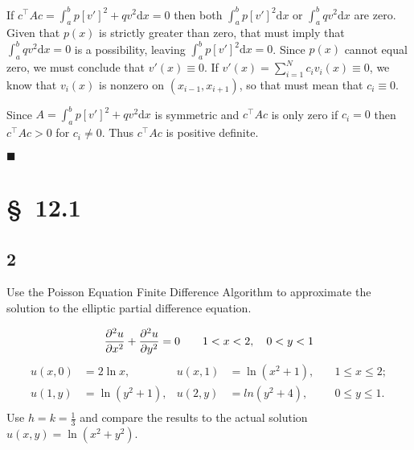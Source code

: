 \documentclass[12pt]{article}
\newcommand{\dd}[1]{\mathrm{d}{#1}}
\begin{document}
\hfill

If $c^\intercal Ac = \int_a^bp[v']^2+qv^2\dd{x} = 0$ then both
$\int_a^bp[v']^2\dd{x}$ or $\int_a^bqv^2\dd{x}$ are zero. Given that
$p(x)$ is strictly greater than zero, that must imply that
$\int_a^bqv^2\dd{x}=0$ is a possibility, leaving
$\int_a^bp[v']^2\dd{x}=0$. Since $p(x)$ cannot equal zero, we must
conclude that $v'(x)\equiv0$. If
$v'(x)=\sum_{i=1}^Nc_iv_i(x)\equiv0$, we know that $v_i(x)$ is
nonzero on $(x_{i-1},x_{i+1})$, so that must mean that $c_i\equiv0$.

Since $A=\int_a^bp[v']^2+qv^2\dd{x}$ is symmetric and $c^\intercal Ac$
is only zero if $c_i=0$ then $c^\intercal Ac>0$ for $c_i\neq0$. Thus
$c^\intercal Ac$ is positive definite.

\hfill $\blacksquare$

\section{\S~12.1}
\subsection{2}
Use the Poisson Equation Finite Difference Algorithm to approximate
the solution to the elliptic partial difference equation.

\begin{equation*}
  \frac{\partial^2 u}{\partial x^2}+\frac{\partial^2 u}{\partial
    y^2}=0 \qquad 1<x<2,\quad 0<y<1 \\
\end{equation*}
\begin{equation*}
  \begin{aligned}
    u(x,0)&=2\ln x, &u(x,1)&=\ln(x^2+1),\quad &1\leq x\leq 2; \\
    u(1,y)&=\ln(y^2+1), &u(2,y)&=ln(y^2+4),\quad &0\leq y \leq 1. \\
  \end{aligned}
\end{equation*}
Use $h=k=\frac{1}{3}$ and compare the results to the actual solution
$u(x,y)=\ln(x^2+y^2)$.

\hfill
\end{document}
